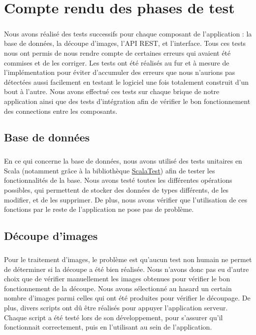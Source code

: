 \chapter{Compte rendu des phases de test}

\paragraph{}
Nous avons réalisé des tests successifs pour chaque composant de l'application : la base de données, la découpe d'images, l'API REST, et l'interface. Tous ces tests nous ont permis de nous rendre compte de certaines erreurs qui avaient été commises et de les corriger. Les tests ont été réalisés au fur et à mesure de l'implémentation pour éviter d'accumuler des erreurs que nous n'aurions pas détectées aussi facilement en testant le logiciel une fois totalement construit d'un bout à l'autre. Nous avons effectué ces tests sur chaque brique de notre application ainsi que des tests d'intégration afin de vérifier le bon fonctionnement des connections entre les composants.

\section{Base de données}

\paragraph{}
En ce qui concerne la base de données, nous avons utilisé des tests unitaires en Scala (notamment grâce à la bibliothèque \href{http://www.scalatest.org/}{ScalaTest}) afin de tester les fonctionnalités de la base. Nous avons testé toutes les différentes opérations possibles, qui permettent de stocker des données de types différents, de les modifier, et de les supprimer. De plus, nous avons vérifier que l'utilisation de ces fonctions par le reste de l'application ne pose pas de problème.

\section{Découpe d'images}

\paragraph{}
Pour le traitement d'images, le problème est qu'aucun test non humain ne permet de déterminer si la découpe a été bien réalisée. Nous n'avons donc pas eu d'autre choix que de vérifier manuellement les images obtenues pour vérifier le bon fonctionnement de la découpe. Nous avons sélectionné au hasard un certain nombre d'images parmi celles qui ont été produites pour vérifier le découpage. De plus, divers scripts ont dû être réalisés pour appuyer l'application serveur. Chaque script a été testé lors de son développement, pour s'assurer qu'il fonctionnait correctement, puis en l'utilisant au sein de l'application.

